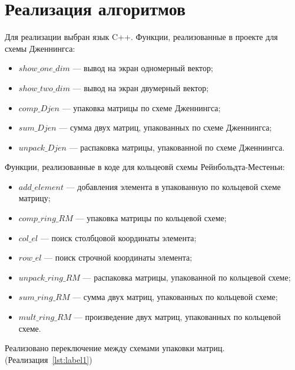 \documentclass[12pt, a4paper]{article}
\begin{document}
\section{Реализация алгоритмов}
Для реализации выбран язык C++.
Функции, реализованные в проекте для схемы Дженнингса:
\begin{itemize}
	\item $show\_one\_dim$ --- вывод на экран одномерный 
	вектор;
	\item $show\_two\_dim$ --- вывод на экран двумерный
	вектор;
	\item $comp\_Djen$ --- упаковка матрицы по схеме
	Дженнингса;
	\item $sum\_Djen$ --- сумма двух матриц, упакованных 
	по схеме Дженнингса;
	\item $unpack\_Djen$ --- распаковка матрицы, 
	упакованной по схеме Дженнингса.
\end{itemize}
Функции, реализованные в коде для кольцеовй схемы 
Рейнбольдта-Местеньи:
\begin{itemize}
	\item $add\_element$ --- добавления элемента в упакованную по кольцевой 
	схеме матрицу;
	\item $comp\_ring\_RM$ --- упаковка матрицы по 
	кольцевой схеме;
	\item $col\_el$ --- поиск столбцовой координаты
	элемента;
	\item $row\_el$ --- поиск строчной координаты
	элемента;
	\item $unpack\_ring\_RM$ --- распаковка матрицы, 
	упакованной по кольцевой схеме;
	\item $sum\_ring\_RM$ --- сумма двух матриц, 
	упакованных по кольцевой схеме;
	\item $mult\_ring\_RM$ --- произведение двух матриц, 
	упакованных по кольцевой схеме.
\end{itemize}
Реализовано переключение между схемами упаковки матриц.
(Реализация~\ref{lst:label1})
\end{document}
